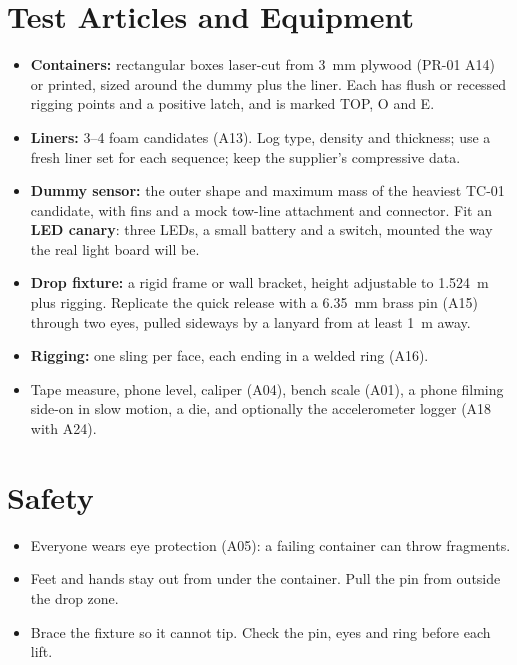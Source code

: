 \documentclass[final]{dbfdoc}
\begin{document}
\section{Test Articles and Equipment}
\begin{itemize}
\item \textbf{Containers:} rectangular boxes laser-cut from 3~mm plywood (PR-01 A14) or printed, sized around the dummy plus the liner. Each has flush or recessed rigging points and a positive latch, and is marked TOP, O and E.
\item \textbf{Liners:} 3--4 foam candidates (A13). Log type, density and thickness; use a fresh liner set for each sequence; keep the supplier's compressive data.
\item \textbf{Dummy sensor:} the outer shape and maximum mass of the heaviest TC-01 candidate, with fins and a mock tow-line attachment and connector. Fit an \textbf{LED canary}: three LEDs, a small battery and a switch, mounted the way the real light board will be.
\item \textbf{Drop fixture:} a rigid frame or wall bracket, height adjustable to 1.524~m plus rigging. Replicate the quick release with a 6.35~mm brass pin (A15) through two eyes, pulled sideways by a lanyard from at least 1~m away.
\item \textbf{Rigging:} one sling per face, each ending in a welded ring (A16).
\item Tape measure, phone level, caliper (A04), bench scale (A01), a phone filming side-on in slow motion, a die, and optionally the accelerometer logger (A18 with A24).
\end{itemize}

\section{Safety}
\begin{itemize}
\item Everyone wears eye protection (A05): a failing container can throw fragments.
\item Feet and hands stay out from under the container. Pull the pin from outside the drop zone.
\item Brace the fixture so it cannot tip. Check the pin, eyes and ring before each lift.
\end{itemize}
\end{document}
